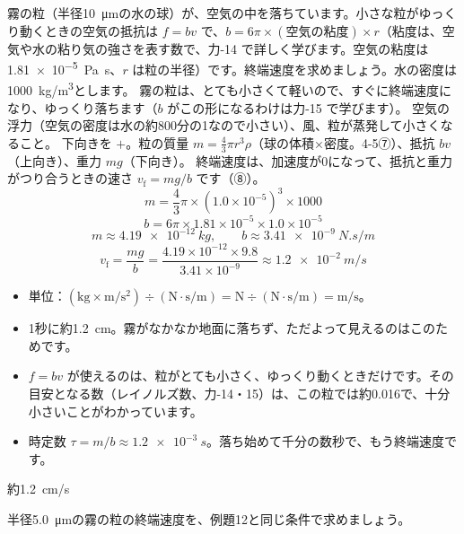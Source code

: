 \begin{phreidai}[霧の粒が落ちる速さ]
\label{ph:力-2:ex12}霧の粒（半径\qty{10}{\micro m}の水の球）が、空気の中を落ちています。小さな粒がゆっくり動くときの空気の抵抗は $f=bv$ で、$b=6\pi\times(\text{空気の粘度})\times r$（粘度は、空気や水の粘り気の強さを表す数で、力-14 で詳しく学びます。空気の粘度は \qty{1.81e-5}{Pa.s}、$r$ は粒の半径）です。終端速度を求めましょう。水の密度は\qty{1000}{kg/m^3}とします。
\phbamen
霧の粒は、とても小さくて軽いので、すぐに終端速度になり、ゆっくり落ちます（$b$ がこの形になるわけは力-15 で学びます）。
\phmushi
空気の浮力（空気の密度は水の約800分の1なので小さい）、風、粒が蒸発して小さくなること。
\phzu
下向きを $+$。粒の質量 $m=\tfrac{4}{3}\pi r^3\rho$（球の体積×密度。\mbox{4-5⑦}）、抵抗 $bv$（上向き）、重力 $mg$（下向き）。
\phriyu
終端速度は、加速度が0になって、抵抗と重力がつり合うときの速さ $v_{\mathrm f}=mg/b$ です（⑧）。
\phtateru
\[ m=\frac{4}{3}\pi\times(1.0\times10^{-5})^3\times1000 \]
\[ b=6\pi\times1.81\times10^{-5}\times1.0\times10^{-5} \]
\phtoku
\[ m\approx\qty{4.19e-12}{kg},\qquad b\approx\qty{3.41e-9}{N.s/m} \]
\[ v_{\mathrm f}=\frac{mg}{b}=\frac{4.19\times10^{-12}\times9.8}{3.41\times10^{-9}}\approx\qty{1.2e-2}{m/s} \]
\phtashikame
\begin{itemize}[leftmargin=1.2\zw, itemsep=1pt, topsep=1pt, label={\color{bkTheme}●}]
\item 単位：$(\mathrm{kg\times m/s^2})\div(\mathrm{N\cdot s/m})=\mathrm N\div(\mathrm{N\cdot s/m})=\mathrm{m/s}$。
\item 1秒に約\qty{1.2}{cm}。霧がなかなか地面に落ちず、ただよって見えるのはこのためです。
\item $f=bv$ が使えるのは、粒がとても小さく、ゆっくり動くときだけです。その目安となる数（レイノルズ数、力-14・15）は、この粒では約0.016で、十分小さいことがわかっています。
\item 時定数 $\tau=m/b\approx\qty{1.2e-3}{s}$。落ち始めて千分の数秒で、もう終端速度です。
\end{itemize}
\kotae 約\qty{1.2}{cm/s}
\end{phreidai}
\begin{jibun}
半径\qty{5.0}{\micro m}の霧の粒の終端速度を、例題12と同じ条件で求めましょう。
\end{jibun}

